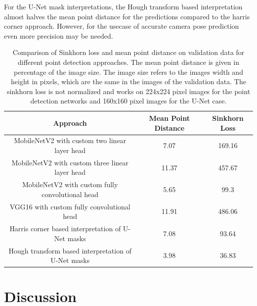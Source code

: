 \documentclass[10pt]{book}
\begin{document}
For the U-Net mask interpretations, the Hough transform based interpretation almost halves the mean point distance for the predictions compared to the harris corner approach. However, for the usecase of accurate camera pose prediction even more precision may be needed.

\begin{table}
  \begin{tabular}{ c c c }
   Approach & Mean Point Distance & Sinkhorn Loss \\ 
   \hline
   MobileNetV2 with custom two linear layer head        & 7.07 & 169.16 \\
   MobileNetV2 with custom three linear layer head      & 11.37 & 457.67 \\
   MobileNetV2 with custom fully convolutional head     & 5.65 & 99.3 \\
   VGG16 with custom fully convolutional head           & 11.91 & 486.06 \\
   Harris corner based interpretation of U-Net masks    & 7.08 & 93.64 \\
   Hough transform based interpretation of U-Net masks  & 3.98 & 36.83 \\
   \hline
  \end{tabular}
  \caption{\label{tab:pet_valdata_results}Comparison of Sinkhorn loss and mean point distance on validation data for different point detection approaches. The mean point distance is given in percentage of the image size. The image size refers to the images width and height in pixels, which are the same in the images of the validation data. The sinkhorn loss is not normalized and works on 224x224 pixel images for the point detection networks and 160x160 pixel images for the U-Net case. }
\end{table}

\section{Discussion}
\end{document}
